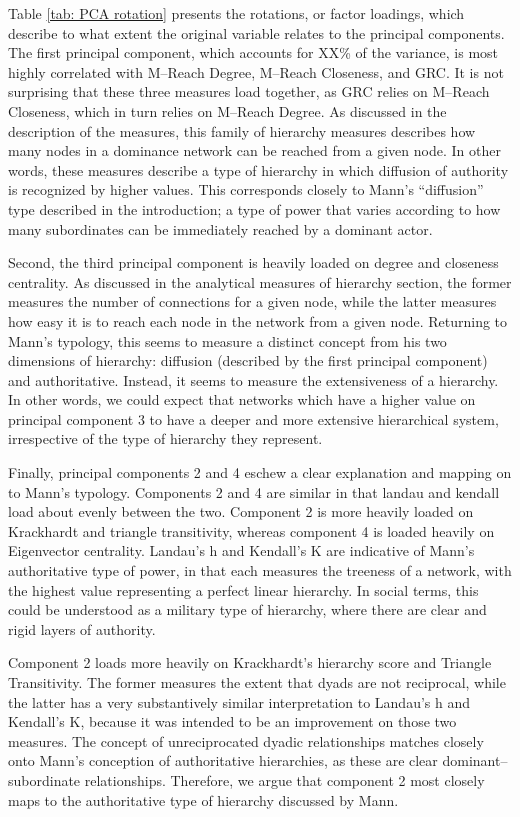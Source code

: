 \documentclass[3p,times]{elsarticle}
\begin{document}
Table \ref{tab: PCA rotation} presents the rotations, or factor loadings, which describe to what extent the original variable relates to the principal components. The first principal component, which accounts for XX\% of the variance, is most highly correlated with M--Reach Degree, M--Reach Closeness, and GRC. It is not surprising that these three measures load together, as GRC relies on M--Reach Closeness, which in turn relies on M--Reach Degree. As discussed in the description of the measures, this family of hierarchy measures describes how many nodes in a dominance network can be reached from a given node. In other words, these measures describe a type of hierarchy in which diffusion of authority is recognized by higher values. This corresponds closely to Mann's ``diffusion'' type described in the introduction; a type of power that varies according to how many subordinates can be immediately reached by a dominant actor.

Second, the third principal component is heavily loaded on degree and closeness centrality. As discussed in the analytical measures of hierarchy section, the former measures the number of connections for a given node, while the latter measures how easy it is to reach each node in the network from a given node. Returning to Mann's typology, this seems to measure a distinct concept from his two dimensions of hierarchy: diffusion (described by the first principal component) and authoritative. Instead, it seems to measure the extensiveness of a hierarchy. In other words, we could expect that networks which have a higher value on principal component 3 to have a deeper and more extensive hierarchical system, irrespective of the type of hierarchy they represent.

Finally, principal components 2 and 4 eschew a clear explanation and mapping on to Mann's typology. Components 2 and 4 are similar in that landau and kendall load about evenly between the two. Component 2 is more heavily loaded on Krackhardt and triangle transitivity, whereas component 4 is loaded heavily on Eigenvector centrality. Landau's h and Kendall's K are indicative of Mann's authoritative type of power, in that each measures the treeness of a network, with the highest value representing a perfect linear hierarchy. In social terms, this could be understood as a military type of hierarchy, where there are clear and rigid layers of authority. 

Component 2 loads more heavily on Krackhardt's hierarchy score and Triangle Transitivity. The former measures the extent that dyads are not reciprocal, while the latter has a very substantively similar interpretation to Landau's h and Kendall's K, because it was intended to be an improvement on those two measures. The concept of unreciprocated dyadic relationships matches closely onto Mann's conception of authoritative hierarchies, as these are clear dominant--subordinate relationships. Therefore, we argue that component 2 most closely maps to the authoritative type of hierarchy discussed by Mann.
\end{document}
